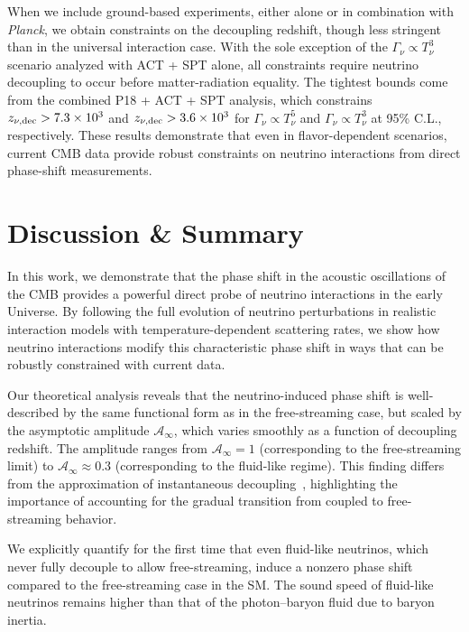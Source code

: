 When we include ground-based experiments, either alone or in combination with \textit{Planck}, we obtain constraints on the decoupling redshift, though less stringent than in the universal interaction case. With the sole exception of the $\Gamma_\nu \propto T_\nu^3$ scenario analyzed with ACT + SPT alone, all constraints require neutrino decoupling to occur before matter-radiation equality. The tightest bounds come from the combined P18 + ACT + SPT analysis, which constrains $z_{\nu,\rm dec} > 7.3 \times 10^3$ and $z_{\nu,\rm dec} > 3.6 \times 10^3$ for $\Gamma_\nu \propto T_\nu^5$ and $\Gamma_\nu \propto T_\nu^3$ at 95\% C.L., respectively. These results demonstrate that even in flavor-dependent scenarios, current CMB data provide robust constraints on neutrino interactions from direct phase-shift measurements.


\section{Discussion \& Summary}
\label{sec:ch13-4}

\noindent In this work, we demonstrate that the phase shift in the acoustic oscillations of the CMB provides a powerful direct probe of neutrino interactions in the early Universe. By following the full evolution of neutrino perturbations in realistic interaction models with temperature-dependent scattering rates, we show how neutrino interactions modify this characteristic phase shift in ways that can be robustly constrained with current data.

Our theoretical analysis reveals that the neutrino-induced phase shift is well-described by the same functional form as in the free-streaming case, but scaled by the asymptotic amplitude $\mathcal{A}_\infty$, which varies smoothly as a function of decoupling redshift. The amplitude ranges from $\mathcal{A}_\infty = 1$ (corresponding to the free-streaming limit) to $\mathcal{A}_\infty \approx 0.3$ (corresponding to the fluid-like regime). This finding differs from the approximation of instantaneous decoupling~\cite{Choi:2018gho,Loverde:2022wih}, highlighting the importance of accounting for the gradual transition from coupled to free-streaming behavior.

We explicitly quantify for the first time that even fluid-like neutrinos, which never fully decouple to allow free-streaming, induce a nonzero phase shift compared to the free-streaming case in the SM. The sound speed of fluid-like neutrinos remains higher than that of the photon--baryon fluid due to baryon inertia.

